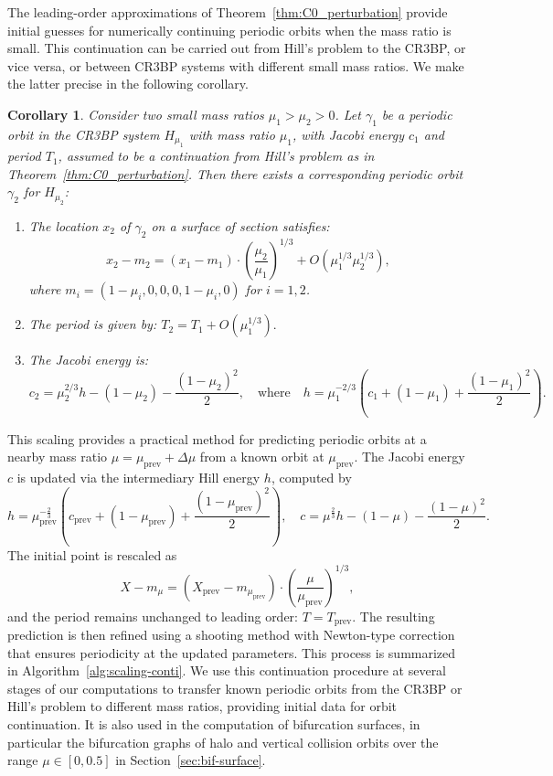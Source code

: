 \documentclass[pdflatex,sn-mathphys-ay]{sn-jnl}%
\theoremstyle{thmstyleone}%
\newtheorem{corollary}[theorem]{Corollary}%
\theoremstyle{thmstyletwo}%
\theoremstyle{thmstylethree}%
\begin{document}
The leading-order approximations of Theorem~\ref{thm:C0_perturbation} provide initial guesses for numerically continuing periodic orbits when the mass ratio is small. This continuation can be carried out from Hill's problem to the CR3BP, or vice versa, or between CR3BP systems with different small mass ratios. We make the latter precise in the following corollary.
\begin{corollary}
\label{cor:scaling-conti}
    Consider two small mass ratios $\mu_1>\mu_2>0$. Let $\gamma_1$ be a periodic orbit in the CR3BP system $H_{\mu_1}$ with mass ratio $\mu_1$, with Jacobi energy $c_1$ and period $T_1$, assumed to be a continuation from Hill's problem as in Theorem~\ref{thm:C0_perturbation}. Then there exists a corresponding periodic orbit $\gamma_2$ for $H_{\mu_2}$:
    \begin{enumerate}
        \item The location $x_2$ of $\gamma_2$ on a surface of section satisfies:
        \[
        x_{2} - m_{2} = (x_{1} - m_{1}) \cdot \left( \frac{\mu_{2}}{\mu_{1}} \right)^{1/3} + O(\mu_{1}^{1/3} \mu_{2}^{1/3}),
        \]
        where $m_i = (1 - \mu_i, 0, 0, 0, 1 - \mu_i, 0)$ for $i=1,2$.
        \item The period is given by:
        $
        T_{2} = T_{1} + O(\mu_{1}^{1/3}).
        $
        \item The Jacobi energy is:
        \[
        c_2 = \mu_{2}^{2/3} h - (1 - \mu_{2}) - \frac{(1 - \mu_{2})^2}{2},
        \quad
        \textrm{where}
        \quad
        h = \mu_{1}^{-2/3} \left( c_1 + (1 - \mu_{1}) + \frac{(1 - \mu_{1})^2}{2} \right).
        \]
    \end{enumerate}
\end{corollary}

This scaling provides a practical method for predicting periodic orbits at a nearby mass ratio $\mu = \mu_{\text{prev}} + \Delta\mu$ from a known orbit at $\mu_{\text{prev}}$. The Jacobi energy $c$ is updated via the intermediary Hill energy $h$, computed by
\[
h = \mu_{\text{prev}}^{-\frac{2}{3}} \left( c_{\text{prev}} + (1 - \mu_{\text{prev}}) + \frac{(1 - \mu_{\text{prev}})^2}{2} \right), \quad
c = \mu^{\frac{2}{3}} h - (1 - \mu) - \frac{(1 - \mu)^2}{2}.
\]
The initial point is rescaled as
\[
X - m_\mu = (X_{\text{prev}} - m_{\mu_{\text{prev}}}) \cdot \left( \frac{\mu}{\mu_{\text{prev}}} \right)^{1/3},
\]
and the period remains unchanged to leading order: $T = T_{\text{prev}}$. The resulting prediction is then refined using a shooting method with Newton-type correction that ensures periodicity at the updated parameters. This process is summarized in Algorithm~\ref{alg:scaling-conti}. 
We use this continuation procedure at several stages of our computations to transfer known periodic orbits from the CR3BP or Hill's problem to different mass ratios, providing initial data for orbit continuation. It is also used in the computation of bifurcation surfaces, in particular the bifurcation graphs of halo and vertical collision orbits over the range $\mu \in [0,0.5]$ in Section~\ref{sec:bif-surface}.
\end{document}
